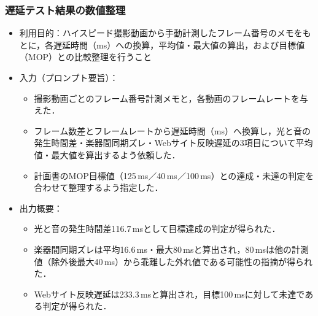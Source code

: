 \documentclass[lualatex,paper=a4paper,jafontsize=11.5pt,jafontscale=1.05]{jlreq}
\begin{document}
\subsubsection{遅延テスト結果の数値整理}
\begin{itemize}
    \item 利用目的：ハイスピード撮影動画から手動計測したフレーム番号のメモをもとに，各遅延時間（ms）への換算，平均値・最大値の算出，および目標値（MOP）との比較整理を行うこと
    \item 入力（プロンプト要旨）：
    \begin{itemize}
        \item 撮影動画ごとのフレーム番号計測メモと，各動画のフレームレートを与えた．
        \item フレーム数差とフレームレートから遅延時間（ms）へ換算し，光と音の発生時間差・楽器間同期ズレ・Webサイト反映遅延の3項目について平均値・最大値を算出するよう依頼した．
        \item 計画書のMOP目標値（125\,ms／40\,ms／100\,ms）との達成・未達の判定を合わせて整理するよう指定した．
    \end{itemize}
    \item 出力概要：
    \begin{itemize}
        \item 光と音の発生時間差116.7\,msとして目標達成の判定が得られた．
        \item 楽器間同期ズレは平均16.6\,ms・最大80\,msと算出され，80\,msは他の計測値（除外後最大40\,ms）から乖離した外れ値である可能性の指摘が得られた．
        \item Webサイト反映遅延は233.3\,msと算出され，目標100\,msに対して未達である判定が得られた．
    \end{itemize}
\end{itemize}
\end{document}
